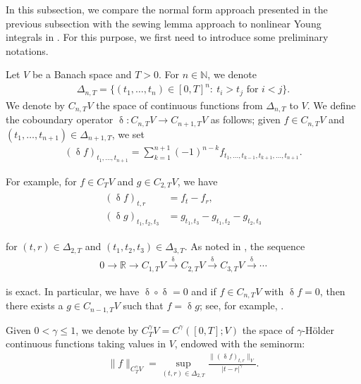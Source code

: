\documentclass[letterpaper, 11pt,  reqno]{amsart}
\newcommand{\1}{\hspace{0.5mm}\text{I}\hspace{0.5mm}}
\newcommand{\noi}{\noindent}
\newcommand{\R}{\mathbb{R}}
\newcommand{\updl}{\updelta}
\newcommand{\Dl}{\Delta}
\newcommand{\g}{\gamma}
\newcommand{\N}{\mathbb{N}}
\newcommand{\too}{\longrightarrow}
\numberwithin{equation}{section}
\numberwithin{theorem}{section}
\begin{document}
In this subsection, we
compare  the normal form approach 
presented in the previous subsection  with the sewing lemma approach 
to nonlinear Young integrals in \cite{CGLLO1}.
For this purpose, we first need to introduce some preliminary notations.


Let $V$ be a Banach space and $T>0$.
For $n\in\N$, we denote 
\begin{align*}
\Delta_{n, T} = 
\big\{ (t_1, \ldots, t_n) \in [0,T]^n: \ t_i > t_j 
\text{ for } i < j\big\}.
\end{align*}
We denote by $C_{n,T}V$ 
the space of continuous functions 
from $\Delta_{n,T}$ to $V$. 
%
%
%
We define the coboundary operator 
$\updl: C_{n,T} V  \to C_{n+1,T} V$ 
as follows; 
given  $f\in C_{n,T} V$ 
and $(t_1,\ldots, t_{n+1}) \in \Dl_{{n+1},T}$, 
we set
\begin{align*}
(\updl f)_{t_1,\ldots , t_{n+1}} = 
\sum_{k=1}^{n+1} (-1)^{n-k} f_{t_1, \ldots, t_{k-1}, t_{k+1}, \ldots, t_{n+1}}.
\end{align*}



\noi
For example, for $f\in C_T V$
and 
$g\in C_{2,T} V$, 
we have 
\begin{align}
\begin{split}
(\updl f )_{t,r} &= f_t - f_r, \\
(\updl g)_{t_1,t_2,t_3} &= 
g_{t_1,t_3} - g_{t_1,t_2} - g_{t_2,t_3}
\end{split}
\label{dl1}
\end{align}



\noi
for $(t,r)\in\Dl_{2,T}$
and $(t_1,t_2,t_3) \in \Dl_{3,T}$.
As noted in \cite{GT10}, 
the sequence 
\begin{align*}
0 \too \R \too C_{1, T}V \stackrel{\updl}{\too} C_{2, T}V
\stackrel{\updl}{\too} C_{3, T}V
\stackrel{\updl}{\too} \cdots
\end{align*}

\noi
is exact. 
In particular, we have 
 $\updl\circ\updl =0$ and 
if $f \in C_{n,T} V$ with $\updl f =0$, 
then there exists a $g\in C_{n-1,T}V$ 
such that $f= \updl g$; 
see, for example,  \cite[Lemma 2.1]{GT10}. 

Given $0 < \g \le 1$, we denote by $C^\g_T V = C^\g([0, T]; V)$ the space of $\g$-H\"older continuous functions taking values in $V$, endowed  with the seminorm:
\begin{align*}
\|f\|_{C^\g_T V} = \sup_{(t,r)\in \Dl_{2,T}} 
\frac{\|(\updl f)_{t,r}\|_V}{|t-r|^\g}.
\end{align*}
\end{document}

